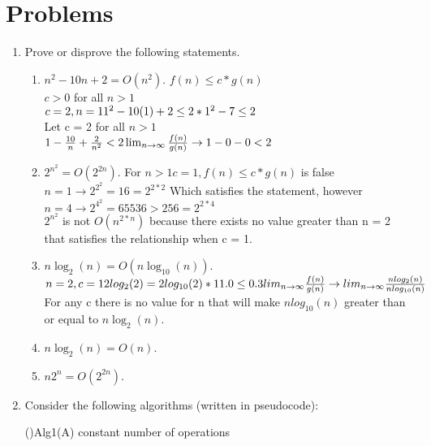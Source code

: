 \documentclass[11pt]{amsart}
\begin{document}
\section*{Problems}

%


\begin{enumerate}
\item Prove or disprove the following statements.
\begin{enumerate}
\item $n^2 - 10n + 2 = O(n^2)$.
\subitem $f(n)\leq c*g(n)$\\$c>0$ for all $n>1$\\$c=2, n=1\\1^2-10(1)+2\leq 2*1^2\\-7\leq 2$\\Let c = 2 for all $n > 1$\\$1-\frac{10}{n}+\frac{2}{n^2}<2\\\lim_{n \to \infty}\frac{f(n)}{g(n)}\rightarrow 1 - 0 - 0 < 2$  
\item $2^{n^2} = O(2^{2n})$.
\subitem For $n > 1 c = 1, f(n)\leq c*g(n)$ is false\\$n=1 \rightarrow 2^{2^2} = 16 = 2^{2*2}$ Which satisfies the statement, however\\$n = 4 \rightarrow 2^{4^2} = 65536 > 256 = 2^{2*4}$\\$2^{n^2}$ is not $O(n^{2*n})$ because there exists no value greater than n = 2 that satisfies the relationship when c = 1.
\item $n\log_2(n) = O(n\log_{10}(n))$.
\subitem $n = 2, c = 1\\2log_2(2) = 2log_{10}(2)*1\\1.0 \leq 0.3\\lim_{n \to \infty}\frac{f(n)}{g(n)} \rightarrow lim_{n \to \infty}\frac{nlog_2(n)}{nlog_{10}(n)}$\\For any c there is no value for n that will make $nlog_{10}(n)$ greater than or equal to $n\log_2(n)$.
\item $n\log_2(n) = O(n)$.
\subitem 
\item $n2^n = O(2^{2n})$.
\subitem 
\end{enumerate}




\bigskip

\item Consider the following algorithms (written in pseudocode):

\smallskip

\begin{algorithm}[H]
\Fn(){Alg1(A)}{
\SetAlgoLined
\SetNoFillComment
\DontPrintSemicolon
	constant number of operations \\
}
\end{algorithm}


\end{enumerate}
\end{document}
